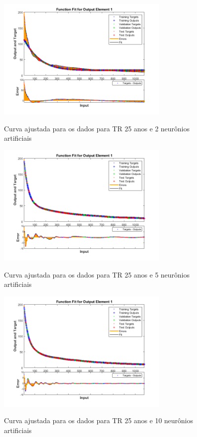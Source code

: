 \begin{figure}[h]
    \caption{Curva ajustada para os dados para TR 25 anos e 2 neurônios artificiais}
    \centering
    \includegraphics[width=0.74\textwidth]{Textuais/Figuras/NN/tr25-2neuronio.png}
    \label{fig:tr25-2n}
\end{figure}

\begin{figure}[h]
    \caption{Curva ajustada para os dados para TR 25 anos e 5 neurônios artificiais}
    \centering
    \includegraphics[width=0.74\textwidth]{Textuais/Figuras/NN/tr25-5neuronio.png}
    \label{fig:tr25-5n}
\end{figure}

\begin{figure}[h]
    \caption{Curva ajustada para os dados para TR 25 anos e 10 neurônios artificiais}
    \centering
    \includegraphics[width=0.74\textwidth]{Textuais/Figuras/NN/tr25-10neuronio.png}
    \label{fig:tr25-10n}
\end{figure}

